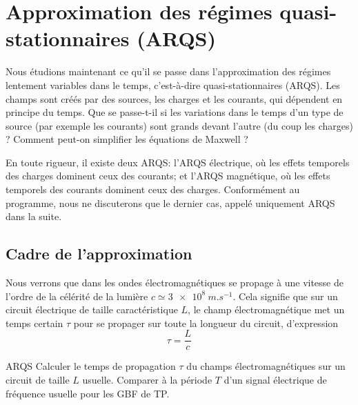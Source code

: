 \documentclass[12pt,fancy]{cours}
\begin{document}
\section{Approximation des régimes quasi-stationnaires (ARQS)}
\label{subsec:ARQS}


Nous étudions maintenant ce qu'il se passe dans l'approximation des régimes lentement variables dans le temps, c'est-à-dire quasi-stationnaires (ARQS). Les champs sont créés par des sources, les charges et les courants, qui dépendent en principe du temps. Que se passe-t-il si les variations dans le temps d'un type de source (par exemple les courants) sont grands devant l'autre (du coup les charges) ? Comment peut-on simplifier les équations de Maxwell ?
\begin{remarque}
En toute rigueur, il existe deux ARQS: l'ARQS électrique, où les effets temporels des charges dominent ceux des courants; et l'ARQS magnétique, où les effets temporels des courants dominent ceux des charges. Conformément au programme, nous ne discuterons que le dernier cas, appelé uniquement ARQS dans la suite.
\end{remarque}

\subsection{Cadre de l’approximation}
Nous verrons que dans les ondes électromagnétiques se propage à une vitesse de l’ordre de la célérité de la lumière $c \simeq \SI{3e8}{m.s^{-1}}$. Cela signifie que sur un circuit électrique de taille caractéristique $L$, le champ électromagnétique met un temps certain $\tau$ pour se propager sur toute la longueur du circuit, d’expression
\begin{equation}
  \tau = \frac{L}{c}
\end{equation}

\begin{exemple}{ARQS}
  Calculer le temps de propagation $\tau$ du champs électromagnétiques sur un circuit de taille $L$ usuelle. Comparer à la période $T$ d'un signal électrique de fréquence  usuelle pour les GBF de TP.
\end{exemple}
\end{document}
